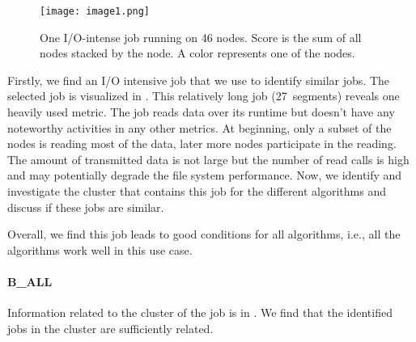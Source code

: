 \documentclass{jhps}
\begin{document}
\begin{figure}
  \centering
  \texttt{[image: image1.png]}
  \caption{One I/O-intense job running on 46 nodes.
Score is the sum of all nodes stacked by the node.
A color represents one of the nodes.}
  \label{fig:use_case}
\end{figure}

Firstly, we find an I/O intensive job that we use to identify similar jobs.
The selected job is visualized in .
This relatively long job (27~segments) reveals one heavily used metric.
The job reads data over its runtime but doesn't have any noteworthy activities in any other metrics.
At beginning, only a subset of the nodes is reading most of the data, later more nodes participate in the reading.
The amount of transmitted data is not large but the number of read calls is high and may potentially degrade the file system performance.
Now, we identify and investigate the cluster that contains this job for the different algorithms and discuss if these jobs are similar.

Overall, we find this job leads to good conditions for all algorithms, i.e., all the algorithms work well in this use case.

\FloatBarrier
\paragraph{B\_ALL}
Information related to the cluster of the job is in .
We find that the identified jobs in the cluster are sufficiently related.
\end{document}
